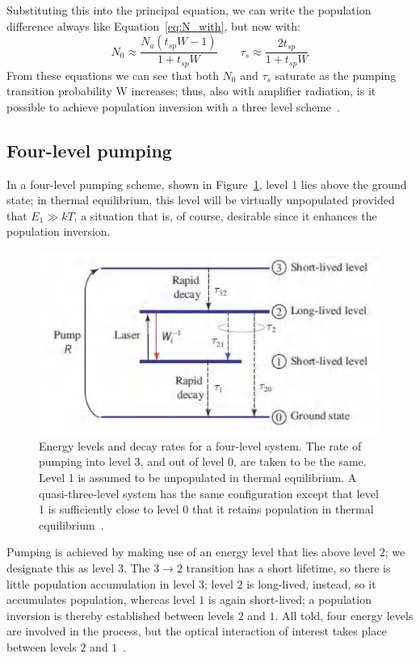 \documentclass[prl,twocolumn]{revtex4-1}
\begin{document}
Substituting this into the principal equation, we can write the population difference always like Equation~\eqref{eq:N_with}, but now with:
%
\begin{equation}
N_0 \approx \frac{N_a(t_{sp}W-1)}{1+t_{sp}W} \quad \quad \tau_s \approx \frac{2t_{sp}}{1+t_{sp}W}
\end{equation}
%
From these equations we can see that both $N_0$ and $\tau_s$ saturate as the pumping transition probability W increases; thus, also with amplifier radiation, is it possible to achieve population inversion with a three level scheme~\cite{Saleh2007}.


\subsection{Four-level pumping}
In a four-level pumping scheme, shown in Figure~\ref{fig:four_level_scheme}, level 1 lies above the ground state; in thermal equilibrium, this level will be virtually unpopulated provided that $E_1 \gg kT$, a situation that is, of course, desirable since it enhances the population inversion.

\begin{figure}[!t]
    \centering
    \includegraphics[width=0.9\linewidth]{Images/four_level_scheme.png}
    \caption{Energy levels and decay rates for a four-level system. The rate of pumping into level 3, and out of level 0, are taken to be the same. Level 1 is assumed to be unpopulated in thermal equilibrium. A quasi-three-level system has the same configuration except that level 1 is sufficiently close to level 0 that it retains population in thermal equilibrium~\cite{Saleh2007}.}
    \label{fig:four_level_scheme}
\end{figure}

Pumping is achieved by making use of an energy level that lies above level $2$; we designate this as level $3$. The $3 \to 2$ transition has a short lifetime, so there is little population accumulation in level $3$; level $2$ is long-lived, instead, so it accumulates population, whereas level $1$ is again short-lived; a population inversion is thereby established between levels $2$ and $1$. All told, four energy levels are involved in the process, but the optical interaction of interest takes place between levels $2$ and $1$~\cite{Saleh2007}.
\end{document}
